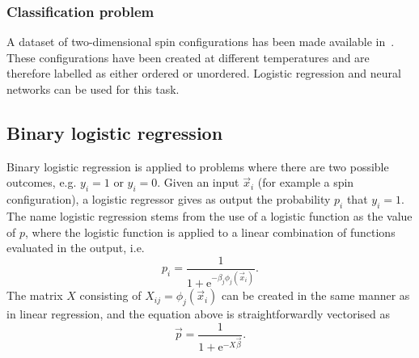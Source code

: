 \documentclass[11pt,british,a4paper]{article}
\renewcommand{\exp}[1]{\mathrm{e}^{#1}}
\numberwithin{equation}{section}
\begin{document}
\subsubsection{Classification problem}
A dataset of two-dimensional spin configurations has been made available in~\cite{mehta}. These configurations have been created at different temperatures and are therefore labelled as either ordered or unordered. Logistic regression and neural networks can be used for this task.

\subsection{Binary logistic regression}
Binary logistic regression is applied to problems where there are two possible outcomes, e.g. \(y_i=1\) or \(y_i=0\). Given an input \(\vec{x}_i\) (for example a spin configuration), a logistic regressor gives as output the probability \(p_i\) that \(y_i=1\).
The name logistic regression stems from the use of a logistic function as the value of \(p\), where the logistic function is applied to a linear combination of functions evaluated in the output, i.e.
\begin{equation}
    p_i = \frac{1}{1 + \exp{-\beta_j \phi_j(\vec{x}_i)}}.
\end{equation}
The matrix \(X\) consisting of \(X_{ij} = \phi_j(\vec{x}_i)\) can be created in the same manner as in linear regression, and the equation above is straightforwardly vectorised as
\begin{equation}
    \vec{p} = \frac{1}{1 + \exp{-X\vec{\beta}}}.
\end{equation}
\end{document}

